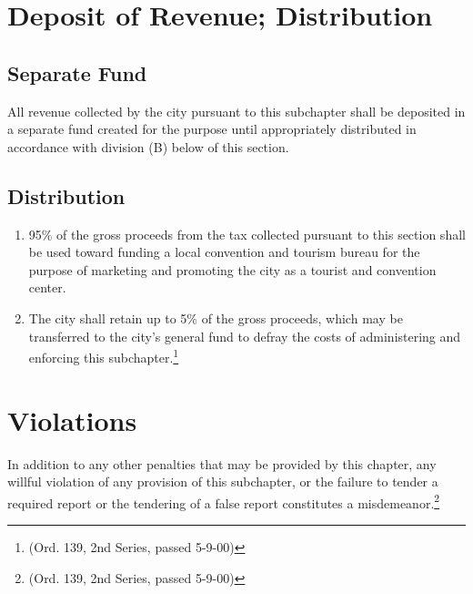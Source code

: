 \section{Deposit of Revenue; Distribution}
\subsection{Separate Fund}
All revenue collected by the city pursuant to this subchapter shall be deposited in a separate fund created for the purpose until appropriately distributed in accordance with division (B) below of this section.
\subsection{Distribution}
\begin{enumerate}
    \item 95\% of the gross proceeds from the tax collected pursuant to this section shall be used toward funding a local convention and tourism bureau for the purpose of marketing and promoting the city as a tourist and convention center.
    \item The city shall retain up to 5\% of the gross proceeds, which may be transferred to the city’s general fund to defray the costs of administering and enforcing this subchapter.\footnote{(Ord. 139, 2nd Series, passed 5-9-00)}
\end{enumerate}

\section{Violations}
In addition to any other penalties that may be provided by this chapter, any willful violation of any provision of this subchapter, or the failure to tender a required report or the tendering of a false report constitutes a misdemeanor.\footnote{(Ord. 139, 2nd Series, passed 5-9-00)}
